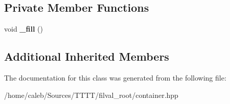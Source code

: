 \subsection*{Private Member Functions}
\begin{DoxyCompactItemize}
\item 
\hypertarget{classfilval_1_1root_1_1ContainerTH1_a2cbd281e6dcdb15b1dda3526cc220ec6}{}\label{classfilval_1_1root_1_1ContainerTH1_a2cbd281e6dcdb15b1dda3526cc220ec6} 
void {\bfseries \+\_\+fill} ()
\end{DoxyCompactItemize}
\subsection*{Additional Inherited Members}


The documentation for this class was generated from the following file\+:\begin{DoxyCompactItemize}
\item 
/home/caleb/\+Sources/\+T\+T\+T\+T/filval\+\_\+root/container.\+hpp\end{DoxyCompactItemize}
